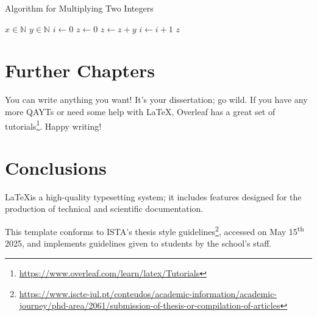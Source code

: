 \documentclass[12pt,reqno,twoside]{amsbook}
\begin{document}
\begin{algorithm}
    \caption{Algorithm for Multiplying Two Integers}
    \begin{algorithmic}
        \Require $x\in\mathbb{N}$
        \Require $y\in\mathbb{N}$
        \State $i \gets 0$
        \State $z \gets 0$
            \State $z \gets z + y$
            \State $i \gets i + 1$
        \EndWhile
        \State \Return $z$
    \end{algorithmic}
    \label{alg:example}
\end{algorithm}










\chapter{Further Chapters}

You can write anything you want! It's your dissertation; go wild. If you have any more \acp{QAYT} or need some help with \LaTeX, Overleaf has a great set of tutorials\footnote{\url{https://www.overleaf.com/learn/latex/Tutorials}}. Happy writing!










\chapter{Conclusions}

\LaTeX\space is a high-quality typesetting system; it includes features designed for the production of technical and scientific documentation.

This template conforms to ISTA's thesis style guidelines\footnote{\url{https://www.iscte-iul.pt/conteudos/academic-information/academic-journey/phd-area/2061/submission-of-thesis-or-compilation-of-articles}}, accessed on May 15\textsuperscript{th} 2025, and implements guidelines given to students by the school's staff.
\end{document}
